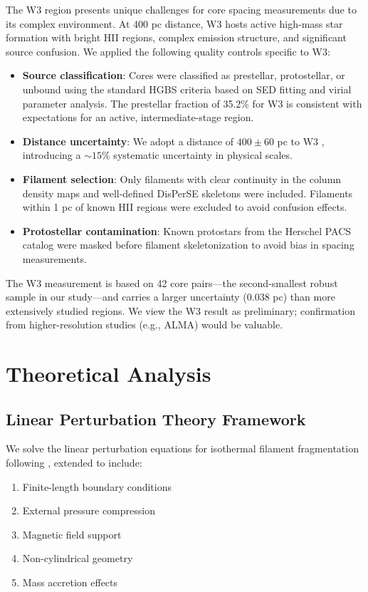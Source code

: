 \documentclass[11pt,a4paper]{article}
\begin{document}
The W3 region presents unique challenges for core spacing measurements due to its complex environment. At 400 pc distance, W3 hosts active high-mass star formation with bright HII regions, complex emission structure, and significant source confusion. We applied the following quality controls specific to W3:

\begin{itemize}
    \item \textbf{Source classification}: Cores were classified as prestellar, protostellar, or unbound using the standard HGBS criteria based on SED fitting and virial parameter analysis. The prestellar fraction of 35.2\% for W3 is consistent with expectations for an active, intermediate-stage region.
    \item \textbf{Distance uncertainty}: We adopt a distance of $400 \pm 60$ pc to W3 \citep{Xu2021}, introducing a $\sim15\%$ systematic uncertainty in physical scales.
    \item \textbf{Filament selection}: Only filaments with clear continuity in the column density maps and well-defined DisPerSE skeletons were included. Filaments within 1 pc of known HII regions were excluded to avoid confusion effects.
    \item \textbf{Protostellar contamination}: Known protostars from the Herschel PACS catalog \citep{Joswig2013} were masked before filament skeletonization to avoid bias in spacing measurements.
\end{itemize}

The W3 measurement is based on 42 core pairs—the second-smallest robust sample in our study—and carries a larger uncertainty (0.038 pc) than more extensively studied regions. We view the W3 result as preliminary; confirmation from higher-resolution studies (e.g., ALMA) would be valuable.

\section{Theoretical Analysis}

\subsection{Linear Perturbation Theory Framework}

We solve the linear perturbation equations for isothermal filament fragmentation following \citet{Inutsuka1992}, extended to include:

\begin{enumerate}
    \item Finite-length boundary conditions \citep{Inutsuka1997}
    \item External pressure compression \citep{Fischera2012}
    \item Magnetic field support \citep{Hennebelle2013}
    \item Non-cylindrical geometry
    \item Mass accretion effects
\end{enumerate}
\end{document}
